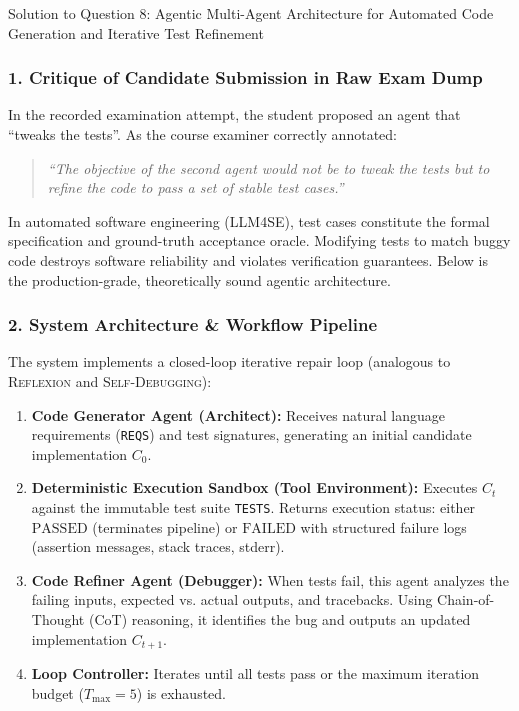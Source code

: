 \documentclass[11pt,a4paper]{article}
\begin{document}
\begin{solutionbox}{Solution to Question 8: Agentic Multi-Agent Architecture for Automated Code Generation and Iterative Test Refinement}
\subsubsection*{1. Critique of Candidate Submission in Raw Exam Dump}
In the recorded examination attempt, the student proposed an agent that ``tweaks the tests''. As the course examiner correctly annotated:
\begin{quote}
\textit{``The objective of the second agent would not be to tweak the tests but to refine the code to pass a set of stable test cases.''}
\end{quote}
In automated software engineering (LLM4SE), test cases constitute the formal specification and ground-truth acceptance oracle. Modifying tests to match buggy code destroys software reliability and violates verification guarantees. Below is the production-grade, theoretically sound agentic architecture.

\subsubsection*{2. System Architecture \& Workflow Pipeline}
The system implements a closed-loop iterative repair loop (analogous to \textsc{Reflexion} and \textsc{Self-Debugging}):
\begin{enumerate}
    \item \textbf{Code Generator Agent (Architect):} Receives natural language requirements (\texttt{REQS}) and test signatures, generating an initial candidate implementation $C_0$.
    \item \textbf{Deterministic Execution Sandbox (Tool Environment):} Executes $C_t$ against the immutable test suite \texttt{TESTS}. Returns execution status: either $\text{PASSED}$ (terminates pipeline) or $\text{FAILED}$ with structured failure logs (assertion messages, stack traces, stderr).
    \item \textbf{Code Refiner Agent (Debugger):} When tests fail, this agent analyzes the failing inputs, expected vs. actual outputs, and tracebacks. Using Chain-of-Thought (CoT) reasoning, it identifies the bug and outputs an updated implementation $C_{t+1}$.
    \item \textbf{Loop Controller:} Iterates until all tests pass or the maximum iteration budget ($T_{\text{max}} = 5$) is exhausted.
\end{enumerate}


\end{solutionbox}
\end{document}
